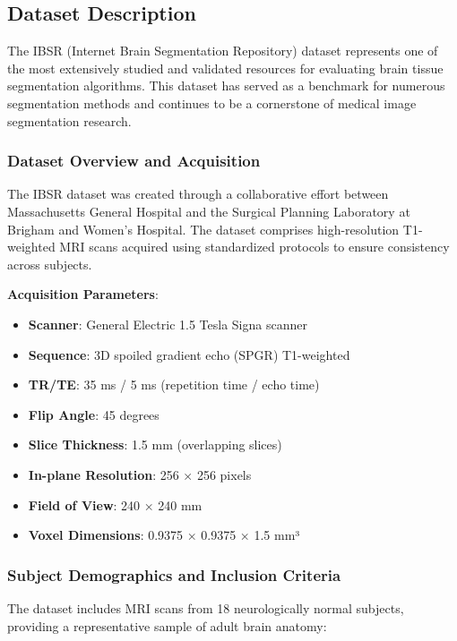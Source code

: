 \documentclass[12pt,a4paper]{article}
\begin{document}
\subsection{Dataset Description}

The IBSR (Internet Brain Segmentation Repository) dataset represents one of the most extensively studied and validated resources for evaluating brain tissue segmentation algorithms. This dataset has served as a benchmark for numerous segmentation methods and continues to be a cornerstone of medical image segmentation research.

\subsubsection{Dataset Overview and Acquisition}

The IBSR dataset was created through a collaborative effort between Massachusetts General Hospital and the Surgical Planning Laboratory at Brigham and Women's Hospital. The dataset comprises high-resolution T1-weighted MRI scans acquired using standardized protocols to ensure consistency across subjects.

\textbf{Acquisition Parameters}:
\begin{itemize}
    \item \textbf{Scanner}: General Electric 1.5 Tesla Signa scanner
    \item \textbf{Sequence}: 3D spoiled gradient echo (SPGR) T1-weighted
    \item \textbf{TR/TE}: 35 ms / 5 ms (repetition time / echo time)
    \item \textbf{Flip Angle}: 45 degrees
    \item \textbf{Slice Thickness}: 1.5 mm (overlapping slices)
    \item \textbf{In-plane Resolution}: 256 × 256 pixels
    \item \textbf{Field of View}: 240 × 240 mm
    \item \textbf{Voxel Dimensions}: 0.9375 × 0.9375 × 1.5 mm³
\end{itemize}

\subsubsection{Subject Demographics and Inclusion Criteria}

The dataset includes MRI scans from 18 neurologically normal subjects, providing a representative sample of adult brain anatomy:
\end{document}
